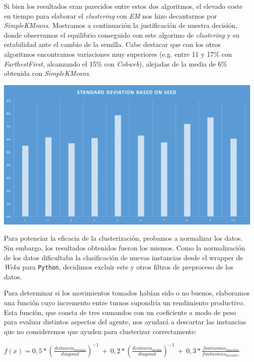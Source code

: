 \documentclass[12pt]{article}
\begin{document}
Si bien los resultados eran parecidos entre estos dos algoritmos, el elevado coste en tiempo para elaborar el \textit{clustering} con \textit{EM} nos hizo decantarnos por \textit{SimpleKMeans}. Mostramos a continuación la justificación de nuestra decisión, donde observamos el equilibrio conseguido con este algorimo de \textit{clustering} y su estabilidad ante el cambio de la semilla. Cabe destacar que con los otros algoritmos encontramos variaciones muy superiores (e.g. entre 11 y 17\% con \textit{FarthestFirst}, alcanzando el 15\% con \textit{Cobweb}), alejadas de la media de 6\% obtenida con \textit{SimpleKMeans}.

\begin{center}
    \includegraphics[width=15cm]{stdff}
\end{center}


Para potenciar la eficacia de la clusterización, probamos a normalizar los datos. Sin embargo, los resultados obtenidos fueron los mismos. Como la normalización de los datos dificultaba la clasificación de nuevas instancias desde el wrapper de \textit{Weka} para \texttt{Python}, decidimos excluir este y otros filtros de preproceso de los datos.

Para determinar si los movimientos tomados habían sido o no buenos, elaboramos una función cuyo incremento entre turnos supondría un rendimiento productivo. Esta función, que consta de tres sumandos con un coeficiente a modo de peso para evaluar distintos aspectos del agente, nos ayudará a descartar las instancias que no consideremos que ayuden para clusterizar correctamente:

\begin{center}
    $ f(x) =  0,5*(\frac{distancia_{cercano}}{diagonal})^{-1}\ +\ 0,2*(\frac{distancia_{media}}{diagonal})^{-1}\ +\ 0,3*\frac{fantasmas_{muertos}}{fantasmas_{Iniciales}} $
\end{center}
\end{document}
